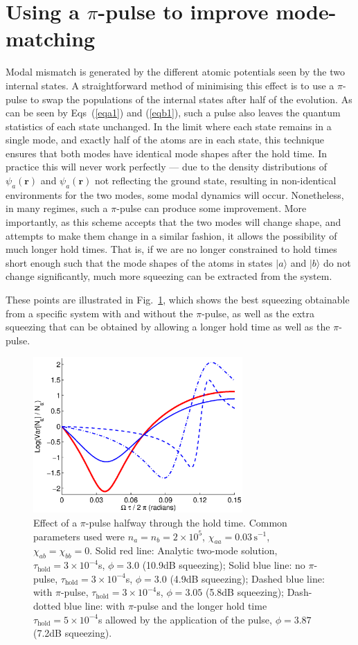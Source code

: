 \documentclass{iopart}
\begin{document}
\section{Using a $\pi$-pulse to improve mode-matching}
Modal mismatch is generated by the different atomic potentials seen by the two internal states.  A straightforward method of minimising this effect is to use a $\pi$-pulse to swap the populations of the internal states after half of the evolution. As can be seen by Eqs~(\ref{eqa1}) and (\ref{eqb1}), such a pulse also leaves the quantum statistics of each state unchanged. In the limit where each state remains in a single mode, and exactly half of the atoms are in each state, this technique ensures that both modes have identical mode shapes after the hold time. In practice this will never work perfectly --- due to the density distributions of $\psi_a(\mathbf{r})$ and $\psi_a(\mathbf{r})$ not reflecting the ground state, resulting in non-identical environments for the two modes, some modal dynamics will occur. Nonetheless, in many regimes, such a $\pi$-pulse can produce some improvement. More importantly, as this scheme accepts that the two modes will change shape, and attempts to make them change in a similar fashion, it allows the possibility of much longer hold times. That is, if we are no longer constrained to hold times short enough such that the mode shapes of the atoms in states $|a \rangle$ and $|b \rangle$ do not change significantly, much more squeezing can be extracted from the system.

These points are illustrated in Fig.~\ref{piPulseFig}, which shows the best squeezing obtainable from a specific system with and without the $\pi$-pulse, as well as the extra squeezing that can be obtained by allowing a longer hold time as well as the $\pi$-pulse.
\begin{figure}
    \centering
    \includegraphics[width=8cm]{figures/pi_pulse.eps}
    \caption{Effect of a $\pi$-pulse halfway through the hold time. Common parameters used were $n_a = n_b =2 \times 10^5$, $\chi_{aa}=0.03\,\text{s}^{-1}$, $\chi_{ab}=\chi_{bb}=0$. Solid red line: Analytic two-mode solution, $\tau_{\mathrm{hold}}=3\times 10^{-4}$s, $\phi=3.0$ (10.9dB squeezing); Solid blue line: no $\pi$-pulse, $\tau_{\mathrm{hold}}=3\times 10^{-4}$s, $\phi=3.0$ (4.9dB squeezing);  Dashed blue line: with $\pi$-pulse, $\tau_{\mathrm{hold}}=3\times 10^{-4}$s, $\phi=3.05$ (5.8dB squeezing); Dash-dotted blue line: with $\pi$-pulse and the longer hold time $\tau_{\mathrm{hold}}=5\times 10^{-4}$s allowed by the application of the pulse, $\phi=3.87$ (7.2dB squeezing).}
    \label{piPulseFig}
\end{figure}
\end{document}
